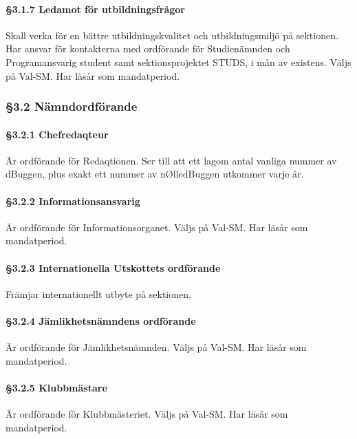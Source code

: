 \paragraph{§3.1.7 Ledamot för utbildningsfrågor}

Skall verka för en bättre utbildningskvalitet och utbildningsmiljö på sektionen. Har ansvar för kontakterna med ordförande för Studienämnden och Programansvarig student samt sektionsprojektet STUDS, i mån av existens. Väljs på Val-SM. Har läsår som mandatperiod.

\subsubsection{§3.2 Nämndordförande}

\paragraph{§3.2.1 Chefredaqteur}

Är ordförande för Redaqtionen. Ser till att ett lagom antal vanliga nummer av dBuggen, plus exakt ett nummer av nØlledBuggen utkommer varje år.

\paragraph{§3.2.2 Informationsansvarig}

Är ordförande för Informationsorganet. Väljs på Val-SM. Har läsår som mandatperiod.

\paragraph{§3.2.3 Internationella Utskottets ordförande}

Främjar internationellt utbyte på sektionen.

\paragraph{§3.2.4 Jämlikhetsnämndens ordförande}

Är ordförande för Jämlikhetsnämnden. Väljs på Val-SM. Har läsår som mandatperiod.

\paragraph{§3.2.5 Klubbmästare}

Är ordförande för Klubbmästeriet. Väljs på Val-SM. Har läsår som mandatperiod.

